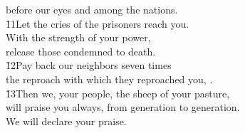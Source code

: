 \begin{poetry}
\poemlll       before our eyes and among the nations. \\
\poeml \v{11}Let the cries of the prisoners reach you. \\
\poemll    With the strength of your power, \\
\poemlll       release those condemned to death. \\
\poeml \v{12}Pay back our neighbors seven times \\
\poemll    the reproach with which they reproached you, . \\
\poemll    \v{13}Then we, your people, the sheep of your pasture, \\
\poemll    will praise you always, from generation to generation. \\
\poemlll       We will declare your praise.
\end{poetry}

